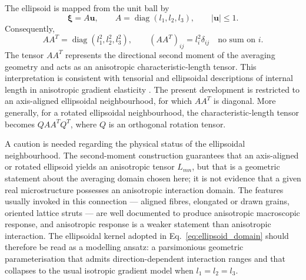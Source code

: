 \documentclass[final,3p,times,fleqn]{elsarticle}
\newcommand{\revtwo}[1]{\textcolor{revtwocolor}{#1}}
\begin{document}
The ellipsoid is mapped from the unit ball by
\[
  \boldsymbol{\xi}=A\mathbf{u},
  \qquad
  A=\operatorname{diag}(l_1,l_2,l_3),
  \qquad
  |\mathbf{u}|\leq 1 .
\]
Consequently,
\begin{equation}\label{eq:AAT}
  AA^T
  =
  \operatorname{diag}(l_1^2,l_2^2,l_3^2),
  \qquad
  (AA^T)_{ij}=l_i^2\delta_{ij}
  \quad \text{no sum on } i .
\end{equation}
The tensor $AA^T$ represents the directional second moment of the
averaging geometry and acts as an anisotropic characteristic-length
tensor. This interpretation is consistent with tensorial and ellipsoidal
descriptions of internal length in anisotropic gradient elasticity
\cite{LazarPo2015,Polizzotto2018,Auffray2019}. The present development
is restricted to an axis-aligned ellipsoidal neighbourhood, for which
$AA^T$ is diagonal. More generally, for a rotated ellipsoidal
neighbourhood, the characteristic-length tensor becomes
$QAA^TQ^T$, where $Q$ is an orthogonal rotation tensor.

\revtwo{A caution is needed regarding the physical status of the
ellipsoidal neighbourhood. The second-moment construction guarantees
that an axis-aligned or rotated ellipsoid yields an anisotropic tensor
$L_{mn}$, but that is a geometric statement about the averaging domain
chosen here; it is not evidence that a given real microstructure
possesses an anisotropic interaction domain. The features usually
invoked in this connection --- aligned fibres, elongated or drawn
grains, oriented lattice struts --- are well documented to produce
anisotropic macroscopic response, and anisotropic response is a weaker
statement than anisotropic interaction. The ellipsoidal kernel adopted
in Eq.~\eqref{eq:ellipsoid_domain} should therefore be read as a
modelling ansatz: a parsimonious geometric parameterisation that admits
direction-dependent interaction ranges and that collapses to the usual
isotropic gradient model when $l_1=l_2=l_3$.}
\end{document}
